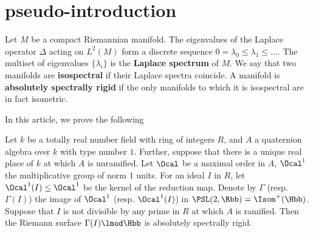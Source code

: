 \documentclass{amsart}
\begin{document}

\section{pseudo-introduction}

Let $M$ be a compact Riemannian manifold. The eigenvalues of the Laplace operator $\Delta$ acting on $L^{2}(M)$ form a discrete sequence $0 =\lambda_{0}\leq \lambda_{1 }\leq \ldots $. The multiset of eigenvalues $\{\lambda_{i}\}$ is the \textbf{Laplace spectrum} of $M$. We say that two manifolds are \textbf{isospectral} if their Laplace spectra coincide. A manifold is \textbf{absolutely spectrally rigid} if the only manifolds to which it is isospectral are in fact isometric.

In this article, we prove the following
\begin{thm}
	Let $k$ be a totally real number field with ring of integers $R$, and $A$ a quaternion algebra over $k$ with type number $1$. Further, suppose that there is a unique real place of $k$ at which $A$ is unramified. Let $\Ocal$ be a maximal order in $A$, $\Ocal^{1}$ the multiplicative group of norm $1$ units. For an ideal $I$ in $R$, let $\Ocal^{1}(I) \leq \Ocal^{1}$ be the kernel of the reduction map. Denote by $\Gamma$ (resp. $\Gamma(I)$) the image of $\Ocal^{1}$ (resp. $\Ocal^{1}(I)$) in $\PSL(2,\Rbb)  = \Isom^{+}( \Hbb)$. Suppose that $I$ is not divisible by any prime in $R$ at which $A$ is ramified. Then the Riemann surface $\Gamma(I) \lmod \Hbb$ is absolutely spectrally rigid.
\end{thm}

\begin{comment}
[TODO] identify the length spectrum for arithmetic hyperbolic surfaces coming
from maximal orders in quaternion algebras
\end{comment}
\end{document}
